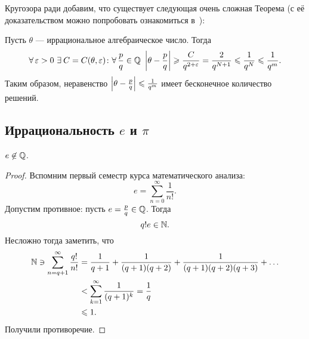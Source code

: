 Кругозора ради добавим, что существует следующая очень сложная Теорема (с её доказательством можно попробовать ознакомиться в~\cite{Ishak2008}):

\begin{ntheorem}
\label{thm:III_Thue-Siegel-Roth}
    Пусть $\theta$ --- иррациональное алгебраическое число. Тогда 
    \[
        \forall \epsilon > 0 \ \exists C = C(\theta, \epsilon)\colon \forall \frac{p}{q} \in \QQ\ \abs{\theta - \frac{p}{q}} \ge \frac{C}{q^{2 + \epsilon}} = \frac{2}{q^{N+1}} \le \frac{1}{q^N} \le \frac{1}{q^m}.
    \]
    Таким образом, неравенство $\left| \theta - \frac{p}{q} \right| \leqslant \frac{1}{q^m}$ имеет бесконечное количество решений.
\end{ntheorem}


\subsection{\texorpdfstring{Иррациональность $e$ и $\pi$}{Иррациональность e и π}}
\label{subsec:III-2}

\begin{ntheorem}
\label{thm:III_E-irrationality}
    $e \not\in \mathbb{Q}$.
\end{ntheorem}
\begin{proof}
    Вспомним первый семестр курса математического анализа:
    \[
        e = \sum_{n=0}^{\infty} \frac{1}{n!}.
    \]
    Допустим противное: пусть $e = \frac{p}{q} \in \mathbb{Q}$. Тогда 
    \[
        q!e \in \mathbb{N}.
    \]
    Несложно тогда заметить, что 
    \begin{align*}
        \mathbb{N} \ni \sum_{n=q+1}^{\infty} \frac{q!}{n!} &= \frac{1}{q+1} + \frac{1}{(q+1)(q+2)} + \frac{1}{(q+1)(q+2)(q+3)} + \dots \\
        &< \sum_{k=1}^{\infty} \frac{1}{(q+1)^k} = \frac{1}{q} \\
        &\leqslant 1.
    \end{align*}
    Получили противоречие.
\end{proof}

